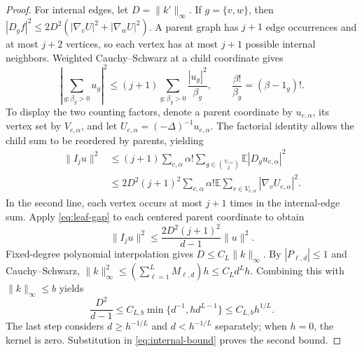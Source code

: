 \documentclass[11pt,reqno]{amsart}
\numberwithin{equation}{section}
\theoremstyle{definition}
\theoremstyle{remark}
\theoremstyle{definition}
\begin{document}
\begin{proof}
For internal edges, let $D=\|k'\|_\infty$.
If $g=\{v,w\}$, then
$|D_gf|^2\le2D^2(|\nabla_vU|^2+|\nabla_wU|^2)$.
A parent graph has $j+1$ edge occurrences and at most $j+2$ vertices, so each vertex has at most $j+1$ possible internal neighbors.
Weighted Cauchy--Schwarz at a child coordinate gives
\[
 \left|\sum_{g:\beta_g>0}u_g\right|^2
 \le(j+1)\sum_{g:\beta_g>0}\frac{|u_g|^2}{\beta_g},
 \qquad \frac{\beta!}{\beta_g}=(\beta-1_g)!.
\]
To display the two counting factors, denote a parent coordinate by $u_{e,\alpha}$, its vertex set by $V_{e,\alpha}$,
and let $U_{e,\alpha}=(-\Delta)^{-1}u_{e,\alpha}$.
The factorial identity allows the child sum to be reordered by parents, yielding
\begin{align*}
 \|I_ju\|^2
 &\le (j+1)\sum_{e,\alpha}\alpha!
       \sum_{g\in\binom{V_{e,\alpha}}2}\mathbb E|D_gu_{e,\alpha}|^2\\
 &\le 2D^2(j+1)^2\sum_{e,\alpha}\alpha!
       \mathbb E\sum_{v\in V_{e,\alpha}}|\nabla_vU_{e,\alpha}|^2.
\end{align*}
In the second line, each vertex occurs at most $j+1$ times in the internal-edge sum.
Apply \eqref{eq:leaf-gap} to each centered parent coordinate to obtain
\begin{equation}\label{eq:internal-bound}
 \|I_ju\|^2\le\frac{2D^2(j+1)^2}{d-1}\|u\|^2.
\end{equation}
Fixed-degree polynomial interpolation gives $D\le C_L\|k\|_\infty$.
By $|P_{\ell,d}|\le1$ and Cauchy--Schwarz,
$\|k\|_\infty^2\le(\sum_{\ell=1}^LM_{\ell,d})h\le C_Ld^Lh$.
Combining this with $\|k\|_\infty\le b$ yields
\[
 \frac{D^2}{d-1}\le C_{L,b}\min\{d^{-1},h d^{L-1}\}
 \le C_{L,b}h^{1/L}.
\]
The last step considers $d\ge h^{-1/L}$ and $d<h^{-1/L}$ separately; when $h=0$, the kernel is zero.
Substitution in \eqref{eq:internal-bound} proves the second bound.
\end{proof}
\end{document}
